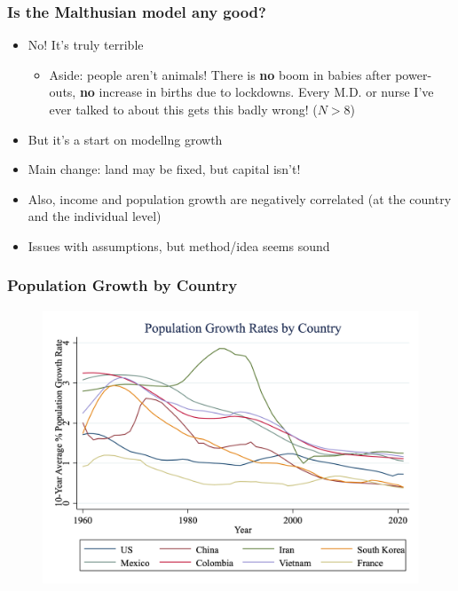 \documentclass{beamer}
\begin{document}
\begin{frame}
\frametitle[alignment=center]{Is the Malthusian model any good?}
\begin{itemize}
\item No!  It's truly terrible
\bigskip
\begin{itemize}
\item Aside: people aren't animals!  There is \textbf{no} boom in babies after power-outs, \textbf{no} increase in births due to lockdowns.  Every M.D. or nurse I've ever talked to about this gets this badly wrong! ($N>8$)
\end{itemize}
\bigskip
\item But it's a start on modellng growth
\bigskip
\item Main change:  land may be fixed, but capital isn't!  
\bigskip
\item Also, income and population growth are negatively correlated (at the country and the individual level)
\bigskip
\item Issues with assumptions, but method/idea seems sound
\end{itemize}
\end{frame}

\begin{frame}
\frametitle[alignment=center]{Population Growth by Country}
\begin{figure}
\centering
\includegraphics[scale=0.25]{Figures/PopGrowth_country.png}
\end{figure}
\end{frame}
\end{document}
